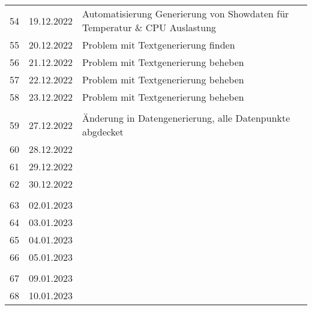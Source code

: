 \begin{longtable}{|l|c|l|}
&               &                                                       \\ \hline 
54  & 19.12.2022    &  Automatisierung Generierung von Showdaten für Temperatur \& CPU Auslastung                                                     \\ \hline 
55  & 20.12.2022    &  Problem mit Textgenerierung finden                                                     \\ \hline 
56  & 21.12.2022    &  Problem mit Textgenerierung beheben                                                    \\ \hline 
57  & 22.12.2022    &  Problem mit Textgenerierung beheben                                                        \\ \hline 
58  & 23.12.2022    &  Problem mit Textgenerierung beheben                                                        \\ \hline 
&               &                                                       \\ \hline 
59  & 27.12.2022    & Änderung in Datengenerierung, alle Datenpunkte abgdecket                                                      \\ \hline 
60  & 28.12.2022    &                                                       \\ \hline 
61  & 29.12.2022    &                                                       \\ \hline 
62  & 30.12.2022    &                                                       \\ \hline 
&               &                                                       \\ \hline 
63  & 02.01.2023    &                                                       \\ \hline 
64  & 03.01.2023    &                                                       \\ \hline 
65  & 04.01.2023    &                                                       \\ \hline 
66  & 05.01.2023    &                                                       \\ \hline 
&               &                                                       \\ \hline 
67  & 09.01.2023    &                                                       \\ \hline 
68  & 10.01.2023    &                                                       \\ \hline 

\end{longtable}
